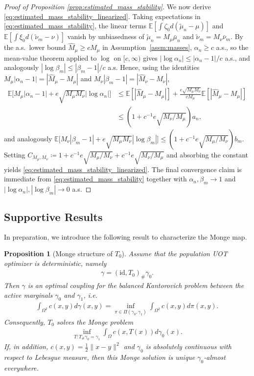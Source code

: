 \documentclass[11pt,reqno]{amsart}
\newtheorem{proposition}[theorem]{Proposition}
\theoremstyle{definition}
\renewcommand{\hat}{\widehat}
\renewcommand{\tilde}{\widetilde}
\newcommand{\Ep}{\mathbb{E}}
\begin{document}
\begin{proof}[Proof of Proposition \ref{prop:estimated_mass_stability}]
We now derive \eqref{eq:estimated_mass_stability_linearized}.
Taking expectations in \eqref{eq:estimated_mass_stability}, the linear terms
$\Ep[\int\zeta_0  d(\tilde\mu_n-\mu)]$ and $\Ep[\int\xi_0  d(\tilde\nu_m-\nu)]$
vanish by unbiasedness of $\tilde\mu_n=M_\mu\bar\mu_n$ and $\tilde\nu_m=M_\nu\bar\nu_m$.
By the a.s.\ lower bound $\hat M_\mu\ge cM_\mu$ in Assumption~\ref{assm:masses}, $\alpha_n\ge c$ a.s., so the mean-value theorem applied to $\log$ on $[c,\infty)$ gives
\(
|\log\alpha_n| \le |\alpha_n-1|/c
\)
a.s., and analogously $|\log\beta_m|\le|\beta_m-1|/c$ a.s. Hence, using the identities $M_\mu|\alpha_n-1|=|\hat M_\mu-M_\mu|$ and $M_\nu|\beta_m-1|=|\hat M_\nu-M_\nu|$,
\begin{align*}
    \Ep \bigl[ M_\mu|\alpha_n-1| + e\sqrt{M_\mu M_\nu} |\log\alpha_n| \bigr]
    &\le \Ep[|\hat M_\mu-M_\mu|] + \frac{e\sqrt{M_\mu M_\nu}}{c M_\mu} \Ep[|\hat M_\mu-M_\mu|] \\
    &\le \left(1 + c^{-1}e\sqrt{M_\nu/M_\mu}\right) a_n,
\end{align*}
and analogously $\Ep \bigl[ M_\nu|\beta_m-1| + e\sqrt{M_\mu M_\nu} |\log\beta_m| \bigr]
    \le \left(1 + c^{-1}e\sqrt{M_\mu/M_\nu}\right) b_m$. Setting
$C_{M_\mu,M_\nu}\coloneqq 1+c^{-1}e\sqrt{M_\mu/M_\nu}+c^{-1}e\sqrt{M_\nu/M_\mu}$
and absorbing the constant yields \eqref{eq:estimated_mass_stability_linearized}.
The final convergence claim is immediate from \eqref{eq:estimated_mass_stability} together with $\alpha_n,\beta_m\to 1$ and $|\log\alpha_n|,|\log\beta_m|\to 0$ a.s.
\end{proof}

\subsection{Supportive Results}


In preparation, we introduce the following result to characterize the Monge map.
\begin{proposition}[Monge structure of $T_0$]
\label{prop:population_target_monge}
Assume that the population UOT optimizer is deterministic, namely
\begin{align}
    \gamma = (\mathrm{id},T_0)_\# \gamma_0.
\end{align}
Then $\gamma$ is an optimal coupling for the \emph{balanced} Kantorovich problem between the active marginals $\gamma_0$ and $\gamma_1$, i.e.
\begin{align}
    \int_{\Omega^2} c(x,y)   d\gamma(x,y)
    =
    \inf_{\pi\in \Pi(\gamma_0,\gamma_1)}
    \int_{\Omega^2} c(x,y)   d\pi(x,y).
\end{align}
Consequently, $T_0$ solves the Monge problem
\begin{align}
\label{eq:population_monge_problem_active}
    \inf_{T:  T_\# \gamma_0 = \gamma_1}
    \int_\Omega c(x,T(x))   d\gamma_0(x).
\end{align}
If, in addition, $c(x,y)=\tfrac{1}{2}\|x-y\|^2$ and $\gamma_0$ is absolutely continuous with respect to Lebesgue measure, then this Monge solution is unique $\gamma_0$-almost everywhere.
\end{proposition}
\end{document}
